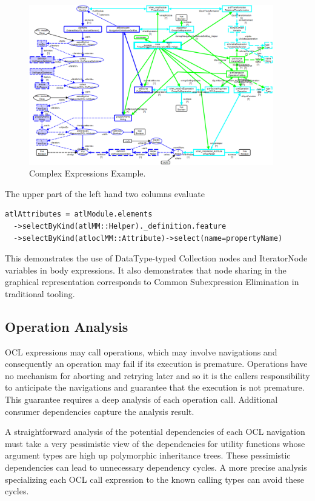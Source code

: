 \documentclass{llncs}
\begin{document}
\begin{figure}[h]
	\centering
	\includegraphics[width=0.95\textwidth]{ComplexExpressionExample.png}
	\caption{Complex Expressions Example.}
	\label{fig:Complex Expressions Example}
\end{figure}

The upper part of the left hand two columns evaluate
\begin{verbatim}
atlAttributes = atlModule.elements
  ->selectByKind(atlMM::Helper)._definition.feature
  ->selectByKind(atloclMM::Attribute)->select(name=propertyName)
\end{verbatim}
This demonstrates the use of DataType-typed Collection nodes and IteratorNode variables in body expressions. It also demonstrates that node sharing in the graphical representation corresponds to Common Subexpression Elimination in traditional tooling.

\subsection{Operation Analysis}

OCL expressions may call operations, which may involve navigations and consequently an operation may fail if its execution is premature. Operations have no mechanism for aborting and retrying later and so it is the callers responsibility to anticipate the navigations and guarantee that the execution is not premature. This guarantee requires a deep analysis of each operation call. Additional consumer dependencies capture the analysis result.

A straightforward analysis of the potential dependencies of each OCL navigation must take a very pessimistic view of the dependencies for utility functions whose argument types are high up polymorphic inheritance trees. These pessimistic dependencies can lead to unnecessary dependency cycles. A more precise analysis specializing each OCL call expression to the known calling types can avoid these cycles.
\end{document}
